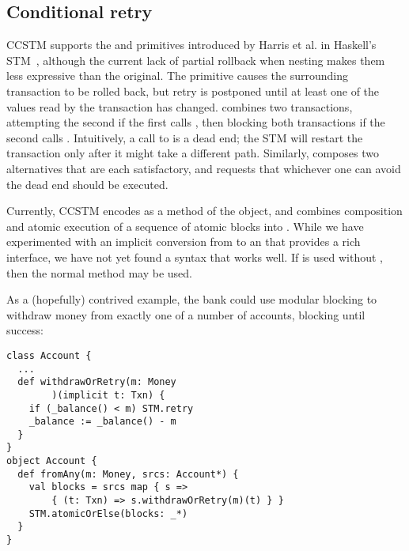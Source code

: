 \subsection{Conditional retry}

CCSTM supports the  and  primitives introduced by
Harris et al. in Haskell's STM~\cite{harris05ctm}, although the current
lack of partial rollback when nesting makes them less expressive than the original.
The  primitive causes the surrounding transaction to be rolled
back, but retry is postponed until at least one of the values read by
the transaction has changed.   combines two transactions,
attempting the second if the first calls , then blocking
both transactions if the second calls .  Intuitively, a call
to  is a dead end; the STM will restart the transaction
only after it might take a different path.  Similarly, 
composes two alternatives that are each satisfactory, and requests that
whichever one can avoid the dead end should be executed.

Currently, CCSTM encodes  as a method of the  object, and 
combines composition and atomic execution of a sequence of atomic blocks into
\code{STM.atomicOrElse[}\code{](blocks: (}\code{ => }\code{)*): }.
While we have experimented with an implicit conversion from 
\code{ => } to an  that provides a
rich interface, we have not yet found a syntax that works well.  If
 is used without , then the normal 
method may be used.

As a (hopefully) contrived example,
the bank could use modular blocking to withdraw money from exactly one of a number of
accounts, blocking until success:
\lstset{numbers=none}
\lstset{xleftmargin=0.125in}
\begin{lstlisting}
class Account {
  ...
  def withdrawOrRetry(m: Money
        )(implicit t: Txn) {
    if (_balance() < m) STM.retry
    _balance := _balance() - m
  }
}
object Account {
  def fromAny(m: Money, srcs: Account*) {
    val blocks = srcs map { s =>
        { (t: Txn) => s.withdrawOrRetry(m)(t) } }
    STM.atomicOrElse(blocks: _*)
  }
}
\end{lstlisting}
\lstset{numbers=left}
\lstset{xleftmargin=0.25in}


